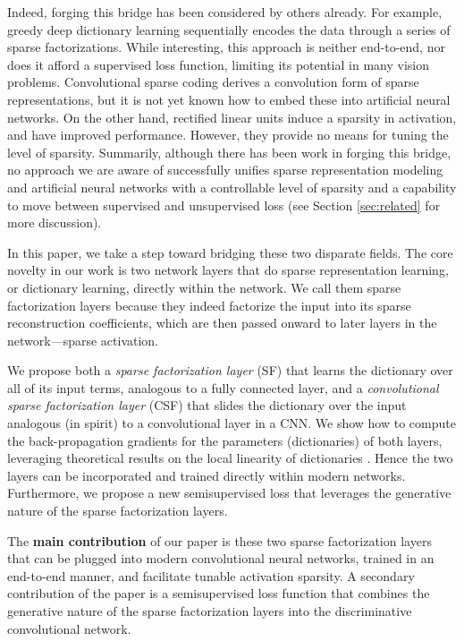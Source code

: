 \documentclass[10pt,twocolumn,letterpaper]{article}
\begin{document}
Indeed, forging this bridge has been considered by others already.  
For example, greedy deep dictionary learning \cite{TaMaSiarXiv2016} 
sequentially encodes the data through a series of sparse factorizations.  While 
interesting, this approach is neither end-to-end, nor does it afford a 
supervised loss function, limiting its potential in many vision problems.  
Convolutional sparse coding \cite{KaSeBoNIPS2010} derives a convolution form of 
sparse representations, but it is not yet known how to embed these into 
artificial neural networks.  On the other hand, rectified linear units 
\cite{GlBoBeAIStats2011} induce a sparsity in activation, and have improved 
performance.  However, they provide no means for tuning the level of sparsity.   
Summarily, although there has been work in forging this bridge, no approach we 
are aware of successfully unifies sparse representation modeling and artificial 
neural networks with a controllable level of sparsity and a capability to move 
between supervised and unsupervised loss (see Section \ref{sec:related} for more 
discussion). 


In this paper, we take a step toward bridging these two disparate fields.
The core novelty in our work is two network layers that do sparse 
representation learning, or dictionary learning, directly within the network.  
We call them sparse factorization layers because they indeed factorize the 
input into its sparse reconstruction coefficients, which are then passed onward 
to later layers in the network---sparse activation.  

We propose both a 
\textit{sparse factorization layer} (SF) that learns the dictionary over all of 
its input terms, analogous to a fully connected layer, and a 
\textit{convolutional sparse factorization layer} (CSF) that slides the 
dictionary over the input analogous (in spirit) to a convolutional layer in a 
CNN.  We show how to compute the back-propagation gradients for the parameters 
(dictionaries) of both layers, leveraging theoretical results on the local 
linearity of dictionaries \cite{MaBaPoTPAMI2012}.  Hence the two layers can be 
incorporated and trained directly within modern networks.  Furthermore, we 
propose a new semisupervised loss that leverages the generative nature of the sparse factorization layers. 

The \textbf{main contribution} of our paper is these two sparse factorization layers that can be plugged into modern convolutional neural networks, trained in an end-to-end manner, and facilitate tunable activation sparsity.  A secondary contribution of the paper is a semisupervised loss function that combines the generative nature of the sparse factorization layers into the discriminative convolutional network.
\end{document}
